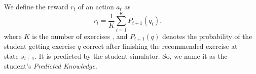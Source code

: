 \documentclass{edm_template}
\begin{document}
We define the reward $r_t$ of an action $a_t$ as 
\begin{equation}
r_t = \frac{1}{K}\sum\limits_{i=1}^KP_{t+1}(q_i),
\end{equation}
where $K$ is the number of exercises
, and $P_{t+1}(q)$ denotes the probability of the student getting exercise $q$ correct after finishing the recommended exercise at state $s_{t+1}$. It is predicted by the student simulator. So, we name it as the student's \emph{Predicted Knowledge}.
\end{document}
